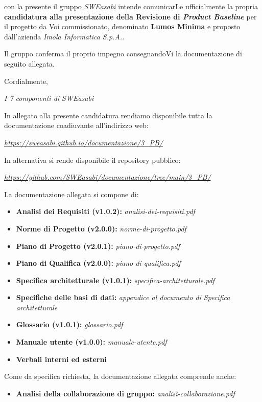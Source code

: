 \documentclass{article}
\begin{document}
con la presente il gruppo \textit{SWEasabi} intende comunicarLe ufficialmente la propria \textbf{candidatura alla presentazione della Revisione di \textit{Product Baseline}} per il progetto da Voi commissionato, denominato \textbf{Lumos Minima} e proposto dall'azienda \textit{Imola Informatica S.p.A.}.

Il gruppo conferma il proprio impegno consegnandoVi la documentazione di seguito allegata.

Cordialmente,

\begin{flushright}
\textit{I 7 componenti di SWEasabi}
\end{flushright}

In allegato alla presente candidatura rendiamo disponibile tutta la documentazione coadiuvante all'indirizzo web:

\begin{center}
    \href{https://sweasabi.github.io/documentazione/3\_PB/}{\textit{https://sweasabi.github.io/documentazione/3\_PB/}}
\end{center}

In alternativa si rende disponibile il repository pubblico:

\begin{center}
    \href{https://github.com/SWEasabi/documentazione/tree/main/3\_PB/}{\textit{https://github.com/SWEasabi/documentazione/tree/main/3\_PB/}}

\end{center}

La documentazione allegata si compone di:
\begin{itemize}
    \item \textbf{Analisi dei Requisiti (v1.0.2):} \textit{analisi-dei-requisiti.pdf}
    \item \textbf{Norme di Progetto (v2.0.0):} \textit{norme-di-progetto.pdf}
    \item \textbf{Piano di Progetto (v2.0.1):} \textit{piano-di-progetto.pdf}
    \item \textbf{Piano di Qualifica (v2.0.0):} \textit{piano-di-qualifica.pdf}
    \item \textbf{Specifica architetturale (v1.0.1):} \textit{specifica-architetturale.pdf}
    \item \textbf{Specifiche delle basi di dati:} \textit{appendice al documento di Specifica architetturale}
    \item \textbf{Glossario (v1.0.1):} \textit{glossario.pdf}
    \item \textbf{Manuale utente (v1.0.0):} \textit{manuale-utente.pdf}
    \item \textbf{Verbali interni ed esterni}
\end{itemize}
Come da specifica richiesta, la documentazione allegata comprende anche:
\begin{itemize}
    \item \textbf{Analisi della collaborazione di gruppo:} \textit{analisi-collaborazione.pdf}
\end{itemize}
\end{document}
